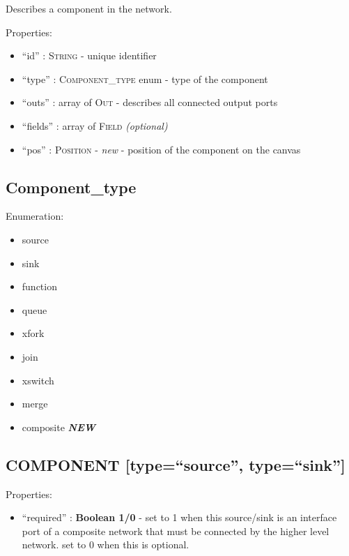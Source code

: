 Describes a component in the network.

Properties:

\begin{itemize}
\itemsep1pt\parskip0pt
\item
  ``id'' : \textsc{String} - unique identifier
\item
  ``type'' : \textsc{Component\_type} enum - type of the component
\item
  ``outs'' : array of \textsc{Out} - describes all connected output
  ports
\item
  ``fields'' : array of \textsc{Field} \emph{(optional)}
\item
  ``pos'' : \textsc{Position} - \emph{new} - position of the component
  on the canvas
\end{itemize}

\subsection{Component\_type}\label{componentux5ftype}

Enumeration:

\begin{itemize}
\itemsep1pt\parskip0pt
\item
  source
\item
  sink
\item
  function
\item
  queue
\item
  xfork
\item
  join
\item
  xswitch
\item
  merge
\item
  composite \textbf{\emph{NEW}}
\end{itemize}

\subsection{COMPONENT {[}type=``source'',
type=``sink''{]}}\label{component-typesource-typesink}

Properties:

\begin{itemize}
\itemsep1pt\parskip0pt
\item
  ``required'' : \textbf{Boolean 1/0} - set to 1 when this source/sink
  is an interface port of a composite network that must be connected by
  the higher level network. set to 0 when this is optional.
\end{itemize}


